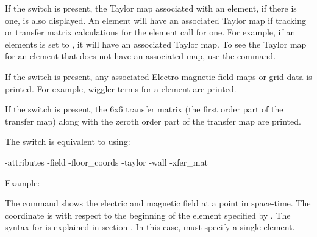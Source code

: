 {{{\begin{description}
If the  switch is present, the Taylor map associated with
an element, if there is one, is also displayed. An element will have
an associated Taylor map if tracking or transfer matrix calculations
for the element call for one. For example, if an elements
 is set to , it will have an associated
Taylor map. To see the Taylor map for an element that does not have an
associated map, use the  command.

If the  switch is present, any associated 
Electro-magnetic field maps or grid data is printed. For example, 
wiggler terms for a   element are printed.

If the  switch is present, the 6x6 transfer matrix (the
first order part of the transfer map) along with the zeroth order part
of the transfer map are printed.

The  switch is equivalent to using:
\begin{example}
  -attributes
  -field
  -floor_coords
  -taylor
  -wall
  -xfer_mat
\end{example}

Example:


\item[show field <ele> <x> <y> <z> \{t\} ] \Newline

The  command shows the electric and magnetic field at a
point in space-time. The  coordinate is with respect to the
beginning of the element specified by .  The syntax for
 is explained in section . In this
case,  must specify a single element.


\item[show global \{-bmad_com\} \{-csr_param\} \{-optimization\} \{-ran_state\} ] \Newline

\vskip -0.2in


\end{description}}}}
